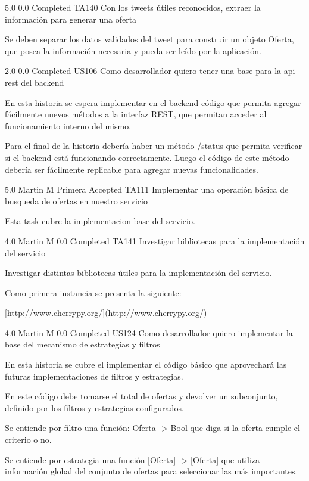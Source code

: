 		{5.0} %
		{} %
		{0.0} %
		{Completed} %
	\task
		{TA140} %
		{Con los tweets útiles reconocidos, extraer la información para generar una oferta} %
		{Se deben separar los datos validados del tweet para construir un objeto
Oferta, que posea la información necesaria y pueda ser leído por la
aplicación.

} %
		{2.0} %
		{} %
		{0.0} %
		{Completed} %
\userStory
	{US106} %
	{Como desarrollador quiero tener una base para la api rest del backend} %
	{En esta historia se espera implementar en el backend código que permita
agregar fácilmente nuevos métodos a la interfaz REST, que permitan acceder al
funcionamiento interno del mismo.

  

Para el final de la historia debería haber un método /status que permita
verificar si el backend está funcionando correctamente. Luego el código de
este método debería ser fácilmente replicable para agregar nuevas
funcionalidades.

} %
	{} %
	{5.0} %
	{Martin M} %
	{Primera} %
	{Accepted} %
	\task
		{TA111} %
		{Implementar una operación básica de busqueda de ofertas en nuestro servicio} %
		{Esta task cubre la implementacion base del servicio.

} %
		{4.0} %
		{Martin M} %
		{0.0} %
		{Completed} %
	\task
		{TA141} %
		{Investigar bibliotecas para la implementación del servicio} %
		{Investigar distintas bibliotecas útiles para la implementación del servicio.

Como primera instancia se presenta la siguiente:

  

[http://www.cherrypy.org/](http://www.cherrypy.org/)

} %
		{4.0} %
		{Martin M} %
		{0.0} %
		{Completed} %
\userStory
	{US124} %
	{Como desarrollador quiero implementar la base del mecanismo de estrategias y filtros} %
	{En esta historia se cubre el implementar el código básico que aprovechará las
futuras implementaciones de filtros y estrategias.

  

En este código debe tomarse el total de ofertas y devolver un subconjunto,
definido por los filtros y estrategias configurados.

  

Se entiende por filtro una función: Oferta -> Bool que diga si la oferta
cumple el criterio o no.

Se entiende por estrategia una función [Oferta] -> [Oferta] que utiliza
información global del conjunto de ofertas para seleccionar las más
importantes.

} %
